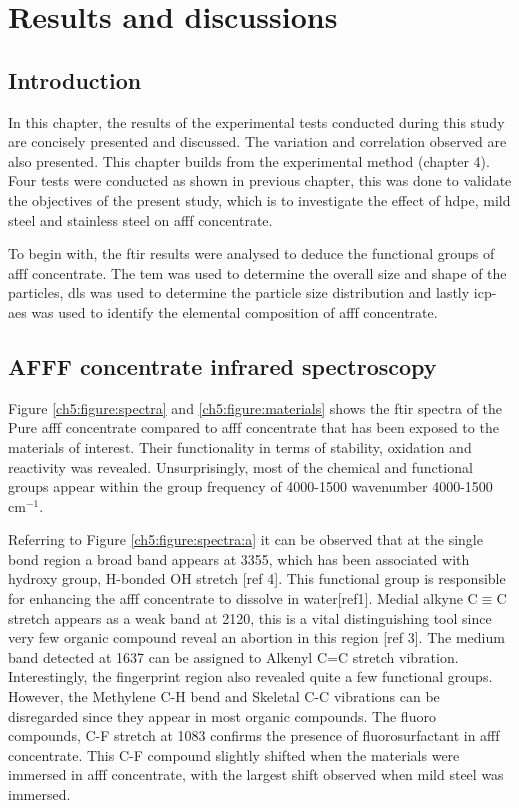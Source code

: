 \chapter{Results and discussions}
\section{Introduction}
In this chapter, the results of the experimental tests conducted during this study are concisely presented and discussed. The variation and correlation observed are also presented. This chapter builds from the experimental method (chapter 4).  Four tests were conducted as shown in previous chapter, this was done to validate the objectives of the present study, which is to investigate the effect of \acrshort{hdpe}, mild steel and stainless steel on \acrshort{afff} concentrate. 

To begin with, the \acrshort{ftir} results were analysed to deduce the functional groups of \acrshort{afff} concentrate. The \acrshort{tem} was used to determine the overall size and shape of the particles, \acrshort{dls} was used to determine the particle size distribution and lastly \acrshort{icp-aes} was used to identify the elemental composition of \acrshort{afff} concentrate.  

\section{AFFF concentrate infrared spectroscopy}
Figure \ref{ch5:figure:spectra} and \ref{ch5:figure:materials} shows the \acrshort{ftir} spectra of the Pure \acrshort{afff} concentrate compared to \acrshort{afff} concentrate that has been exposed to the materials of interest.  Their functionality in terms of stability, oxidation and reactivity was revealed. Unsurprisingly, most of the chemical and functional groups appear within the group frequency of 4000-1500 wavenumber 4000-1500 cm$^{-1}$.

Referring to Figure \ref{ch5:figure:spectra:a} it can be observed that at the single bond region a broad band appears at 3355, which has been associated with hydroxy group, H-bonded OH stretch [ref 4]. This functional group is responsible for enhancing the \acrshort{afff} concentrate to dissolve in water[ref1].  Medial alkyne C$\equiv$C stretch appears as a weak band at 2120, this is a vital distinguishing tool since very few organic compound reveal an abortion in this region [ref 3]. The medium band detected at 1637 can be assigned to Alkenyl C=C stretch vibration. Interestingly, the fingerprint region also revealed quite a few functional groups. However, the Methylene C-H bend and Skeletal C-C vibrations can be disregarded since they appear in most organic compounds. The fluoro compounds, C-F stretch at 1083 confirms the presence of fluorosurfactant in \acrshort{afff} concentrate. This C-F compound slightly shifted when the materials were immersed in \acrshort{afff} concentrate, with the largest shift observed when mild steel was immersed.

